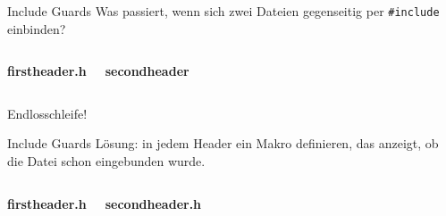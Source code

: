 \begin{frame}[fragile]{Include Guards}
	Was passiert, wenn sich zwei Dateien gegenseitig per \verb|#include| einbinden?
	
	\vspace{2em}
	
	\begin{columns}
		\textbf{firstheader.h}
		
		
		\textbf{secondheader}
		
	\end{columns}
	
	\vspace{2em}
	
	Endlosschleife!
\end{frame}

\begin{frame}[fragile]{Include Guards}
	Lösung: in jedem Header ein Makro definieren, das anzeigt, ob die Datei schon eingebunden wurde.
	
	\vspace{2em}
	
	\begin{columns}
		\column{0.4\textwidth}
		\textbf{firstheader.h}
		
		
		\column{0.4\textwidth}
		\textbf{secondheader.h}
		
	\end{columns}
\end{frame}